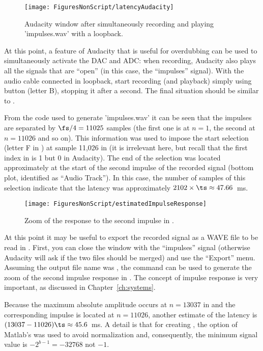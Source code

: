 \begin{figure}
	\centering
		\texttt{[image: FiguresNonScript/latencyAudacity]}
	\caption{Audacity window after simultaneously recording and playing 'impulses.wav' with a loopback.\label{fig:latencyAudacity}}
\end{figure}

At this point, a feature of Audacity that is useful for overdubbing can be used to simultaneously activate the DAC and ADC: when recording, Audacity also plays all the signals that are ``open'' (in this case, the ``impulses'' signal). With the audio cable connected in loopback, start recording (and playback) simply using button (letter B), stopping it after a second. The final situation should be similar to .

From the code used to generate 'impulses.wav' it can be seen that the impulses are separated by $\fs/4=11025$ samples (the first one is at $n=1$, the second at $n=11026$ and so on). This information was used to impose the start selection (letter F in ) at sample 11,026 in  (it is irrelevant here, but recall that the first index in {\matlab} is 1 but 0 in Audacity). The end of the selection was located approximately at the start of the second impulse of the recorded signal (bottom plot, identified as ``Audio Track''). In this case, the number of samples of this selection indicate that the latency was approximately $2102 \times \ts \approx 47.66$~ms.

\begin{figure}
	\centering
		\texttt{[image: FiguresNonScript/estimatedImpulseResponse]}
	\caption{Zoom of the response to the second impulse in .\label{fig:estimatedImpulseResponse}}
\end{figure}

At this point it may be useful to export the recorded signal as a WAVE file to be read in {\matlab}. First, you can close the window with the ``impulses'' signal (otherwise Audacity will ask if the two files should be merged) and use the ``Export'' menu. Assuming the output file name was , the command
 can be used to generate the zoom of the second impulse response in
 . The concept of impulse response is very important, as discussed in Chapter~\ref{ch:systems}.
 
Because the maximum absolute amplitude occurs at $n=13037$ in  and the corresponding impulse is located at $n=11026$, another estimate of the latency is $(13037-11026)\ts \approx 45.6$~ms. A detail is that
for creating , the  option of Matlab's  was used to avoid normalization and, consequently, the minimum signal value is $-2^{b-1}=-32768$ not $-1$.
\eApplication

